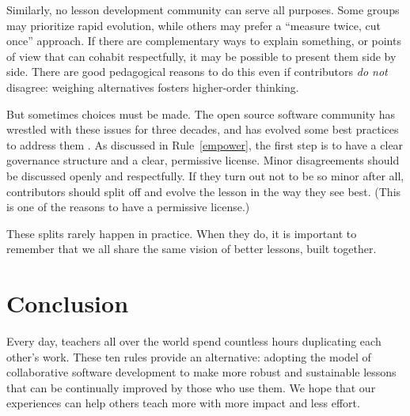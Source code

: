\documentclass[10pt,letterpaper]{article}
\newcommand{\ruleref}[1]{Rule~\ref{#1}}
\begin{document}
Similarly,
no lesson development community can serve all purposes.
Some groups may prioritize rapid evolution,
while others may prefer a ``measure twice, cut once'' approach.
If there are complementary ways to explain something,
or points of view that can cohabit respectfully,
it may be possible to present them side by side.
There are good pedagogical reasons to do this
even if contributors \emph{do not} disagree:
weighing alternatives fosters higher-order thinking.

But sometimes choices must be made.
The open source software community has wrestled with these issues for three decades,
and has evolved some best practices to address them
\cite{producing-oss}.
As discussed in \ruleref{empower},
the first step is to have a clear governance structure and a clear, permissive license.
Minor disagreements should be discussed openly and respectfully.
If they turn out not to be so minor after all,
contributors should split off and evolve the lesson in the way they see best.
(This is one of the reasons to have a permissive license.)

These splits rarely happen in practice.
When they do,
it is important to remember that we all share the same vision of better lessons, built together.

\section*{Conclusion}

Every day,
teachers all over the world spend countless hours duplicating each other's work.
These ten rules provide an alternative:
adopting the model of collaborative software development
to make more robust and sustainable lessons
that can be continually improved by those who use them.
We hope that our experiences can help others teach more
with more impact and less effort.

\nolinenumbers

%
%

\newpage
\end{document}
